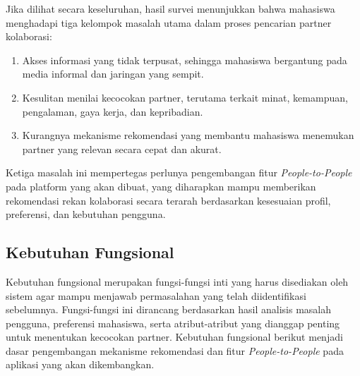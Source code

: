 Jika dilihat secara keseluruhan, hasil survei menunjukkan bahwa mahasiswa menghadapi tiga kelompok masalah utama dalam proses pencarian partner kolaborasi:
\begin{enumerate}
\item {Akses informasi yang tidak terpusat, sehingga mahasiswa bergantung pada media informal dan jaringan yang sempit.} 
\item {Kesulitan menilai kecocokan partner, terutama terkait minat, kemampuan, pengalaman, gaya kerja, dan kepribadian.}
\item {Kurangnya mekanisme rekomendasi yang membantu mahasiswa menemukan partner yang relevan secara cepat dan akurat.}
\end{enumerate}

Ketiga masalah ini mempertegas perlunya pengembangan fitur \textit{People-to-People} pada platform yang akan dibuat, yang diharapkan mampu memberikan rekomendasi rekan kolaborasi secara terarah berdasarkan kesesuaian profil, preferensi, dan kebutuhan pengguna.

\subsection{Kebutuhan Fungsional}
Kebutuhan fungsional merupakan fungsi-fungsi inti yang harus disediakan oleh sistem agar mampu menjawab permasalahan yang telah diidentifikasi sebelumnya. Fungsi-fungsi ini dirancang berdasarkan hasil analisis masalah pengguna, preferensi mahasiswa, serta atribut-atribut yang dianggap penting untuk menentukan kecocokan partner. Kebutuhan fungsional berikut menjadi dasar pengembangan mekanisme rekomendasi dan fitur \textit{People-to-People} pada aplikasi yang akan dikembangkan.

